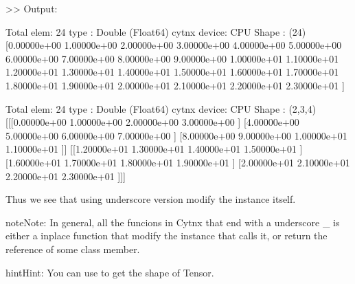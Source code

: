 \documentclass[letterpaper,10pt,english]{sphinxmanual}
\begin{document}
\begin{sphinxVerbatim}[commandchars=\\\{\},numbers=left,firstnumber=1,stepnumber=1]
   
    
    
\end{sphinxVerbatim}

\textgreater{}\textgreater{} Output:

\begin{sphinxVerbatim}[commandchars=\\\{\}]
Total elem: 24
type  : Double (Float64)
cytnx device: CPU
Shape : (24)
[0.00000e+00 1.00000e+00 2.00000e+00 3.00000e+00 4.00000e+00 5.00000e+00 6.00000e+00 7.00000e+00 8.00000e+00 9.00000e+00 1.00000e+01 1.10000e+01 1.20000e+01 1.30000e+01 1.40000e+01 1.50000e+01 1.60000e+01 1.70000e+01 1.80000e+01 1.90000e+01 2.00000e+01 2.10000e+01 2.20000e+01 2.30000e+01 ]

Total elem: 24
type  : Double (Float64)
cytnx device: CPU
Shape : (2,3,4)
[[[0.00000e+00 1.00000e+00 2.00000e+00 3.00000e+00 ]
  [4.00000e+00 5.00000e+00 6.00000e+00 7.00000e+00 ]
  [8.00000e+00 9.00000e+00 1.00000e+01 1.10000e+01 ]]
 [[1.20000e+01 1.30000e+01 1.40000e+01 1.50000e+01 ]
  [1.60000e+01 1.70000e+01 1.80000e+01 1.90000e+01 ]
  [2.00000e+01 2.10000e+01 2.20000e+01 2.30000e+01 ]]]
\end{sphinxVerbatim}

Thus we see that using underscore version modify the instance itself.

\begin{sphinxadmonition}{note}{Note:}
In general, all the funcions in Cytnx that end with a underscore \_ is either a inplace function that modify the instance that calls it, or return the reference of some class member.
\end{sphinxadmonition}

\begin{sphinxadmonition}{hint}{Hint:}
You can use  to get the shape of Tensor.
\end{sphinxadmonition}
\end{document}
